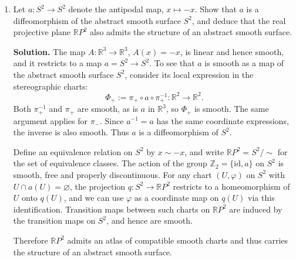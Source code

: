 \documentclass[12pt,a4paper]{article}
\theoremstyle{plain}
\theoremstyle{definition}      %
\begin{document}
\begin{enumerate}[label=\textnormal{(\alph*)}]
		To check compatibility, consider, for instance,
		$\pi_+ \circ \phi^{-1} : \phi(U) \to \mathbb{R}^2$:
		for $(u,v)$ with $u^2+v^2<1$,
		\[
		\phi^{-1}(u,v) = (u,-\sqrt{1-u^2-v^2},v) = (x,y,z),
		\]
		so
		\[
		\pi_+(x,y,z)
		= \left(\frac{x}{1-z},\frac{y}{1-z}\right)
		= \left(
		\frac{u}{1-v},
		\frac{-\sqrt{1-u^2-v^2}}{1-v}
		\right).
		\]
		Here $1-v>0$ on the unit disc, and the right-hand side is clearly a smooth
		function of $(u,v)$.  Similarly
		\[
		\pi_-(x,y,z)
		= \left(
		\frac{u}{1+v},
		\frac{-\sqrt{1-u^2-v^2}}{1+v}
		\right)
		\]
		is smooth on the disc.  The maps $\phi \circ \pi_\pm^{-1}$ are compositions
		of these with the inverses $\pi_\pm^{-1}$, hence are smooth.
		Thus $\phi$ is smoothly compatible with $\pi_\pm$, and the atlas
		$\{\pi_+,\pi_-,\phi\}$ is a smooth atlas on $S^2$.
		
		\medskip
		
		\item
		Let $a : S^2 \to S^2$ denote the antipodal map, $x \mapsto -x$.
		Show that $a$ is a diffeomorphism of the abstract smooth surface $S^2$, and
		deduce that the real projective plane $\mathbb{R}P^{2}$ also admits the
		structure of an abstract smooth surface.
		
		\medskip
		\textbf{Solution.}
		The map $A:\mathbb{R}^3\to\mathbb{R}^3$, $A(x)=-x$, is linear and hence
		smooth, and it restricts to a map $a=S^2\to S^2$.  To see that $a$ is smooth
		as a map of the abstract smooth surface $S^2$, consider its local expression
		in the stereographic charts:
		\[
		\Phi_+ := \pi_+ \circ a \circ \pi_+^{-1} : \mathbb{R}^2 \to \mathbb{R}^2.
		\]
		Both $\pi_+^{-1}$ and $\pi_+$ are smooth, as is $a$ in $\mathbb{R}^3$, so
		$\Phi_+$ is smooth.  The same argument applies for $\pi_-$.  Since
		$a^{-1}=a$ has the same coordinate expressions, the inverse is also smooth.
		Thus $a$ is a diffeomorphism of $S^2$.
		
		Define an equivalence relation on $S^2$ by $x\sim -x$, and write
		$\mathbb{R}P^2 = S^2/\sim$ for the set of equivalence classes.
		The action of the group $\mathbb{Z}_2 = \{ \mathrm{id}, a\}$ on $S^2$ is
		smooth, free and properly discontinuous.  For any chart $(U,\varphi)$ on
		$S^2$ with $U\cap a(U)=\varnothing$, the projection
		$q:S^2\to\mathbb{R}P^2$ restricts to a homeomorphism of $U$ onto $q(U)$, and
		we can use $\varphi$ as a coordinate map on $q(U)$ via this identification.
		Transition maps between such charts on $\mathbb{R}P^2$ are induced by the
		transition maps on $S^2$, and hence are smooth.
		
		Therefore $\mathbb{R}P^2$ admits an atlas of compatible smooth charts and
		thus carries the structure of an abstract smooth surface.
	\end{enumerate}
	
\end{document}
